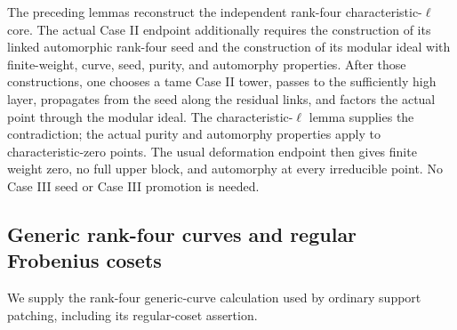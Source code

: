 The preceding lemmas reconstruct the independent rank-four
characteristic-\(\ell\) core.
The actual Case II endpoint additionally requires the
construction of its linked automorphic rank-four seed and the
construction of its modular ideal with finite-weight, curve,
seed, purity, and automorphy properties.
After those constructions, one chooses a tame Case II tower,
passes to the sufficiently high layer, propagates from the
seed along the residual links, and factors the actual point
through the modular ideal.
The characteristic-\(\ell\) lemma supplies the contradiction;
the actual purity and automorphy properties apply to
characteristic-zero points. The usual deformation endpoint
then gives finite weight zero, no full upper block, and
automorphy at every irreducible point.
No Case III seed or Case III promotion is needed.


\subsection{Generic rank-four curves and regular Frobenius cosets}
\label{subsec:sr-four-generic-curves}
We supply the rank-four generic-curve calculation used by
ordinary support patching, including its regular-coset assertion.

